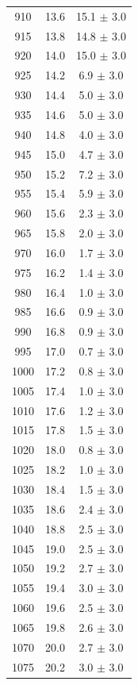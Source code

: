 \documentclass[a4paper,12pt]{article}
\begin{document}
\begin{center}
\begin{longtable}{|c|c|c|}
910 & 13.6 & 15.1 $\pm$  3.0 \\ 
915 & 13.8 & 14.8 $\pm$  3.0 \\ 
920 & 14.0 & 15.0 $\pm$  3.0 \\ 
925 & 14.2 & 6.9 $\pm$  3.0 \\ 
930 & 14.4 & 5.0 $\pm$  3.0 \\ 
935 & 14.6 & 5.0 $\pm$  3.0 \\ 
940 & 14.8 & 4.0 $\pm$  3.0 \\ 
945 & 15.0 & 4.7 $\pm$  3.0 \\ 
950 & 15.2 & 7.2 $\pm$  3.0 \\ 
955 & 15.4 & 5.9 $\pm$  3.0 \\ 
960 & 15.6 & 2.3 $\pm$  3.0 \\ 
965 & 15.8 & 2.0 $\pm$  3.0 \\ 
970 & 16.0 & 1.7 $\pm$  3.0 \\ 
975 & 16.2 & 1.4 $\pm$  3.0 \\ 
980 & 16.4 & 1.0 $\pm$  3.0 \\ 
985 & 16.6 & 0.9 $\pm$  3.0 \\ 
990 & 16.8 & 0.9 $\pm$  3.0 \\ 
995 & 17.0 & 0.7 $\pm$  3.0 \\ 
1000 & 17.2 & 0.8 $\pm$  3.0 \\ 
1005 & 17.4 & 1.0 $\pm$  3.0 \\ 
1010 & 17.6 & 1.2 $\pm$  3.0 \\ 
1015 & 17.8 & 1.5 $\pm$  3.0 \\ 
1020 & 18.0 & 0.8 $\pm$  3.0 \\ 
1025 & 18.2 & 1.0 $\pm$  3.0 \\ 
1030 & 18.4 & 1.5 $\pm$  3.0 \\ 
1035 & 18.6 & 2.4 $\pm$  3.0 \\ 
1040 & 18.8 & 2.5 $\pm$  3.0 \\ 
1045 & 19.0 & 2.5 $\pm$  3.0 \\ 
1050 & 19.2 & 2.7 $\pm$  3.0 \\ 
1055 & 19.4 & 3.0 $\pm$  3.0 \\ 
1060 & 19.6 & 2.5 $\pm$  3.0 \\ 
1065 & 19.8 & 2.6 $\pm$  3.0 \\ 
1070 & 20.0 & 2.7 $\pm$  3.0 \\ 
1075 & 20.2 & 3.0 $\pm$  3.0 \\ 


\end{longtable}
\end{center}
\end{document}
